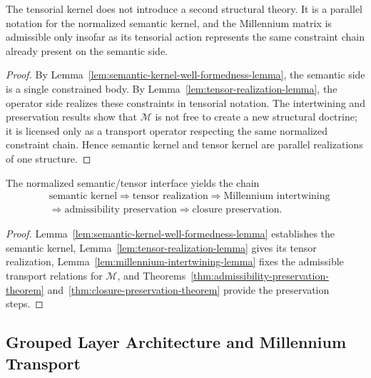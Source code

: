 \begin{proposition}
\label{prop:semantic-tensor-equivalence-proposition}
The tensorial kernel does not introduce a second structural theory. It is a
parallel notation for the normalized semantic kernel, and the Millennium matrix
is admissible only insofar as its tensorial action represents the same
constraint chain already present on the semantic side.
\end{proposition}

\begin{proof}
By Lemma~\ref{lem:semantic-kernel-well-formedness-lemma}, the semantic side is a
single constrained body. By Lemma~\ref{lem:tensor-realization-lemma}, the
operator side realizes these constraints in tensorial notation. The intertwining
and preservation results show that $\mathcal M$ is not free to create a new
structural doctrine; it is licensed only as a transport operator respecting the
same normalized constraint chain. Hence semantic kernel and tensor kernel are
parallel realizations of one structure.
\end{proof}

\begin{corollary}
\label{cor:first-semantic-tensor-forcing-chain}
The normalized semantic/tensor interface yields the chain
\[
\begin{aligned}
&\text{semantic kernel} \Longrightarrow \text{tensor realization} \Longrightarrow \text{Millennium intertwining}\\
&\Longrightarrow \text{admissibility preservation} \Longrightarrow \text{closure preservation}.
\end{aligned}
\]
\end{corollary}

\begin{proof}
Lemma~\ref{lem:semantic-kernel-well-formedness-lemma} establishes the semantic
kernel, Lemma~\ref{lem:tensor-realization-lemma} gives its tensor realization,
Lemma~\ref{lem:millennium-intertwining-lemma} fixes the admissible transport
relations for $\mathcal M$, and Theorems~\ref{thm:admissibility-preservation-theorem}
and~\ref{thm:closure-preservation-theorem} provide the preservation steps.
\end{proof}


\subsection*{Grouped Layer Architecture and Millennium Transport}

